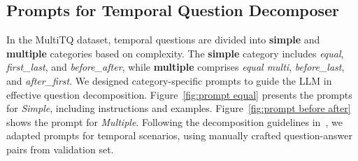\documentclass[11pt]{article}
\begin{document}
\subsection{Prompts for Temporal Question Decomposer}
\label{A:prompts for decom}
In the MultiTQ dataset, temporal questions are divided into \textbf{simple} and \textbf{multiple} categories based on complexity. The \textbf{simple} category includes \textit{equal}, \textit{first\_last}, and \textit{before\_after}, while \textbf{multiple} comprises \textit{equal multi}, \textit{before\_last}, and \textit{after\_first}. We designed category-specific prompts to guide the LLM in effective question decomposition. Figure~\ref{fig:prompt equal} presents the prompts for \textit{Simple}, including instructions and examples. Figure~\ref{fig:prompt before after} shows the prompt for \textit{Multiple}. Following the decomposition guidelines in~\cite{cao-etal-2023-probabilistic}, we adapted prompts for temporal scenarios, using manually crafted question-answer pairs from validation set.
\end{document}
